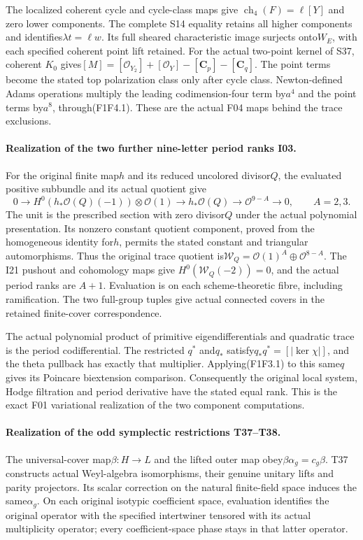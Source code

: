 The localized coherent cycle and cycle-class maps give
$\operatorname{ch}_4(F)=\ell[Y]$ and zero lower components.
The complete S14 equality retains all higher components and
identifies$\lambda t=\ell w$. Its full sheared characteristic
image surjects onto$W_E$, with each specified coherent point
lift retained. For the actual two-point kernel of S37, coherent
$K_0$ gives$[M]=[\mathcal O_{Y_2}]+[\mathcal O_Y]-[\mathbf C_p]
-[\mathbf C_q]$. The point terms become the stated top
polarization class only after cycle class. Newton-defined
Adams operations multiply the leading codimension-four term
by$a^4$ and the point terms by$a^8$, through(F1F4.1).
These are the actual F04 maps behind the trace exclusions.

\paragraph{Realization of the two further nine-letter period ranks I03.}
For the original finite map$h$ and its reduced uncolored divisor$Q$,
the evaluated positive subbundle and its actual quotient give
\[
 0\longrightarrow H^0(h_*\mathcal O(Q)(-1))\otimes\mathcal O(1)
 \longrightarrow h_*\mathcal O(Q)
 \longrightarrow\mathcal O^{9-A}\longrightarrow0,
 \qquad A=2,3.
\]
The unit is the prescribed section with zero divisor$Q$ under
the actual polynomial presentation. Its nonzero constant quotient
component, proved from the homogeneous identity for$h$, permits
the stated constant and triangular automorphisms. Thus the original
trace quotient is$\mathcal W_Q=\mathcal O(1)^A\oplus
\mathcal O^{8-A}$. The I21 pushout and cohomology maps give
$H^0(\mathcal W_Q(-2))=0$, and the actual period ranks are
$A+1$. Evaluation is on each scheme-theoretic fibre, including
ramification. The two full-group tuples give actual connected
covers in the retained finite-cover correspondence.

The actual polynomial product of primitive eigendifferentials
and quadratic trace is the period codifferential. The restricted
$q^*$ and$q_*$ satisfy$q_*q^*=[|\ker\chi|]$, and the theta
pullback has exactly that multiplier. Applying(F1F3.1) to this
same$q$ gives its Poincare biextension comparison. Consequently
the original local system, Hodge filtration and period derivative
have the stated equal rank. This is the exact F01 variational
realization of the two component computations.

\paragraph{Realization of the odd symplectic restrictions T37--T38.}
The universal-cover map$\beta:H\to L$ and the lifted outer map
obey$\beta\alpha_g=c_g\beta$. T37 constructs actual Weyl-algebra
isomorphisms, their genuine unitary lifts and parity projectors.
Its scalar correction on the natural finite-field space induces
the same$\alpha_g$. On each original isotypic coefficient space,
evaluation identifies the original operator with the specified
intertwiner tensored with its actual multiplicity operator;
every coefficient-space phase stays in that latter operator.

